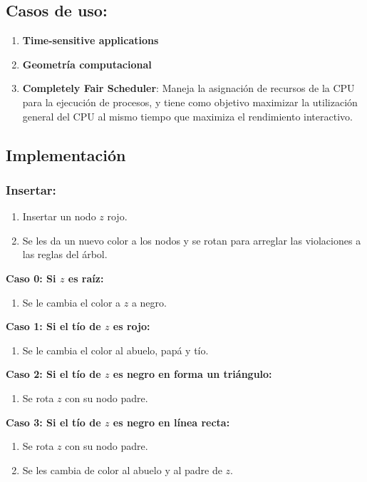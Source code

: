 \documentclass[]{article}
\begin{document}
		\subsection{Casos de uso:}
		\begin{enumerate}
			\item \textbf{Time-sensitive applications}
			\item \textbf{Geometría computacional}
			\item \textbf{Completely Fair Scheduler}: Maneja la asignación de recursos de la CPU para la ejecución de procesos, y tiene como objetivo maximizar la utilización general del CPU al mismo tiempo que maximiza el rendimiento interactivo. 
		\end{enumerate}
		\subsection{Implementación}
			\subsubsection{Insertar:}
				\begin{enumerate}
					\item Insertar un nodo $z$ rojo.
					\item Se les da un nuevo color a los nodos y se rotan para arreglar las violaciones a las reglas del árbol.
				\end{enumerate}
				\par \textbf{Caso 0: Si $z$ es raíz:}
					\begin{enumerate}
						\item Se le cambia el color a $z$ a negro.
					\end{enumerate}
				
				\par \textbf{Caso 1: Si el tío de $z$ es rojo:}
					\begin{enumerate}
						\item Se le cambia el color al abuelo, papá y tío. 
					\end{enumerate}
			
				\par \textbf{Caso 2: Si el tío de $z$ es negro en forma un triángulo:}
					\begin{enumerate}
						\item Se rota $z$ con su nodo padre.
					\end{enumerate}
				
				\par \textbf{Caso 3: Si el tío de $z$ es negro en línea recta:}
					\begin{enumerate}
						\item Se rota $z$ con su nodo padre. 
						\item Se les cambia de color al abuelo y al padre de $z$.
					\end{enumerate}
\end{document}
